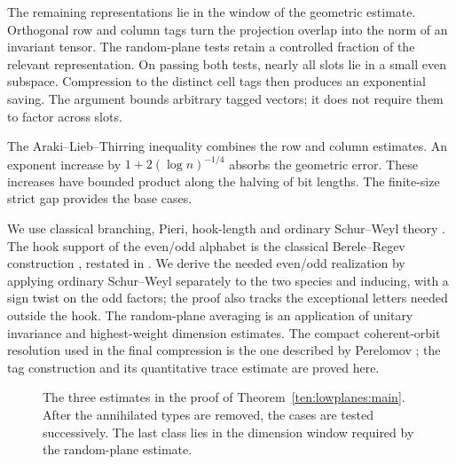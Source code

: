 The remaining representations lie in the window of the geometric estimate. Orthogonal row and column tags turn the projection overlap into the norm of an invariant tensor. The random-plane tests retain a controlled fraction of the relevant representation. On passing both tests, nearly all slots lie in a small even subspace. Compression to the distinct cell tags then produces an exponential saving. The argument bounds arbitrary tagged vectors; it does not require them to factor across slots.

The Araki--Lieb--Thirring inequality \cite{araki1990,audenaert2007} combines the row and column estimates. An exponent increase by $1+2(\log n)^{-1/4}$ absorbs the geometric error. These increases have bounded product along the halving of bit lengths. The finite-size strict gap provides the base cases.

We use classical branching, Pieri, hook-length and ordinary Schur--Weyl theory \cite{Sagan2001,Stanley1999,VershikOkounkov2005}. The hook support of the even/odd alphabet is the classical Berele--Regev construction \cite{BereleRegev1987}, restated in \cite[Theorem~2.1]{Regev2013}. We derive the needed even/odd realization by applying ordinary Schur--Weyl separately to the two species and inducing, with a sign twist on the odd factors; the proof also tracks the exceptional letters needed outside the hook. The random-plane averaging is an application of unitary invariance and highest-weight dimension estimates. The compact coherent-orbit resolution used in the final compression is the one described by Perelomov \cite[Section~2]{Perelomov1972}; the tag construction and its quantitative trace estimate are proved here.

\begin{figure}[ht]
\centering
{}
\caption{The three estimates in the proof of Theorem~\ref{ten:lowplanes:main}. After the annihilated types are removed, the cases are tested successively. The last class lies in the dimension window required by the random-plane estimate.}
\label{fig:three-ranges}
\end{figure}


